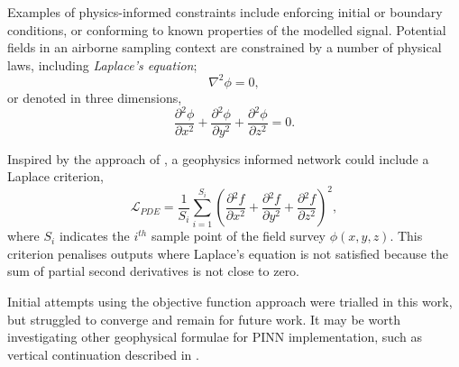 \documentclass[manuscript.tex]{subfiles}
\begin{document}
Examples of physics-informed constraints include enforcing initial or boundary conditions, or conforming to known properties of the modelled signal.
Potential fields in an airborne sampling context are constrained by a number of physical laws, including \emph{Laplace's equation};
\[
    \nabla^2 \phi = 0,
\]
or denoted in three dimensions,
\begin{equation}
    \label{eqn:Laplace}
    \frac{\partial{}^2\phi}{\partial{}x^2} + \frac{\partial{}^2\phi}{\partial{}y^2} + \frac{\partial{}^2\phi}{\partial{}z^2} = 0.
\end{equation}

Inspired by the approach of \textcite{raissiPhysicsinformedNeuralNetworks2019}, a geophysics informed network could include a Laplace criterion,
\begin{equation}
    \label{eqn:cri_laplace}
    \mathcal{L}_{PDE} = \frac{1}{S_i}\sum_{i=1}^{S_i} \left(\frac{\partial{}^2f}{\partial{}x^2} + \frac{\partial{}^2f}{\partial{}y^2} + \frac{\partial{}^2f}{\partial{}z^2}\right)^2,
\end{equation}
where \(S_i\) indicates the \(i^{th}\) sample point of the field survey \(\phi(x, y, z)\).
This criterion penalises outputs where Laplace's equation is not satisfied because the sum of partial second derivatives is not close to zero.


Initial attempts using the objective function approach were trialled in this work, but struggled to converge and remain for future work.
It may be worth investigating other geophysical formulae for PINN implementation, such as vertical continuation described in \textcite{blakelyPotentialTheoryGravity1996}.
\end{document}
